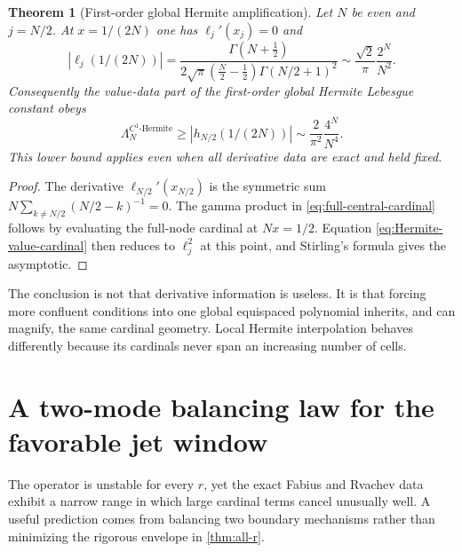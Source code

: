 \documentclass[11pt,oneside]{article}
\newtheorem{theorem}{Theorem}[section]
\theoremstyle{definition}
\theoremstyle{remark}
\begin{document}
\begin{theorem}[First-order global Hermite amplification]
\label{thm:global-hermite}
Let $N$ be even and $j=N/2$.  At $x=1/(2N)$ one has
$\ell_j'(x_j)=0$ and
\begin{equation}
 |\ell_j(1/(2N))|
 =\frac{\Gamma(N+\tfrac12)}
 {2\sqrt\pi(\tfrac N2-\tfrac12)\Gamma(N/2+1)^2}
 \sim \frac{\sqrt2}{\pi}\frac{2^N}{N^2}.
 \label{eq:full-central-cardinal}
\end{equation}
Consequently the value-data part of the first-order global Hermite Lebesgue constant obeys
\begin{equation}
 \Lambda_N^{C^1\text{-Hermite}}
 \ge |h_{N/2}(1/(2N))|
 \sim \frac{2}{\pi^2}\frac{4^N}{N^4}.
 \label{eq:Hermite-square-growth}
\end{equation}
This lower bound applies even when all derivative data are exact and held fixed.
\end{theorem}

\begin{proof}
The derivative $\ell_{N/2}'(x_{N/2})$ is the symmetric sum
$N\sum_{k\ne N/2}(N/2-k)^{-1}=0$.  The gamma product in
\eqref{eq:full-central-cardinal} follows by evaluating the full-node cardinal at
$Nx=1/2$.  Equation \eqref{eq:Hermite-value-cardinal} then reduces to $\ell_j^2$ at this
point, and Stirling's formula gives the asymptotic.
\end{proof}

The conclusion is not that derivative information is useless.  It is that forcing more
confluent conditions into one global equispaced polynomial inherits, and can magnify, the
same cardinal geometry.  Local Hermite interpolation behaves differently because its
cardinals never span an increasing number of cells.

\section{A two-mode balancing law for the favorable jet window}
\label{sec:balance}

The operator is unstable for every $r$, yet the exact Fabius and Rvachev data exhibit a
narrow range in which large cardinal terms cancel unusually well.  A useful prediction
comes from balancing two boundary mechanisms rather than minimizing the rigorous envelope
in \cref{thm:all-r}.
\end{document}
